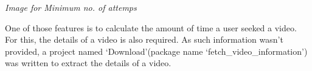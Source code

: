 \documentclass[a4paper,12pt,oneside]{sphinxmanual}
\begin{document}
\emph{Image for Minimum no. of attemps}
\begin{figure}[htbp]
\centering

\end{figure}

One of those features is to calculate the amount of time a user seeked a video. For this, the details of a video is also required. As such information wasn't provided, a project named `Download'(package name `fetch\_video\_information') was written to extract the details of a video.
\end{document}
